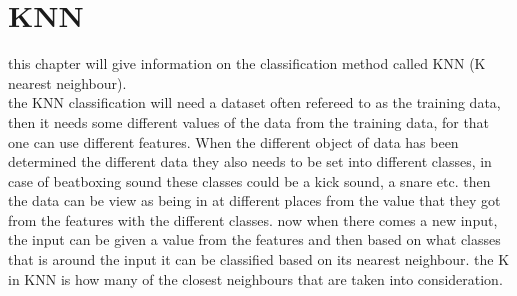 \section{KNN}
this chapter will give information on the classification method called KNN (K nearest neighbour).\\
the KNN classification will need a dataset often refereed to as the training data, then it needs some different values of the data from the training data, for that one can use different features. When the different object of data has been determined the different data they also needs to be set into different classes, in case of beatboxing sound these classes could be a kick sound, a snare etc. then the data can be view as being in at different places from the value that they got from the features with the different classes. now when there comes a new input, the input can be given a value from the features and then based on what classes that is around the input it can be classified based on its nearest neighbour. the K in KNN is how many of the closest neighbours that are taken into consideration. 